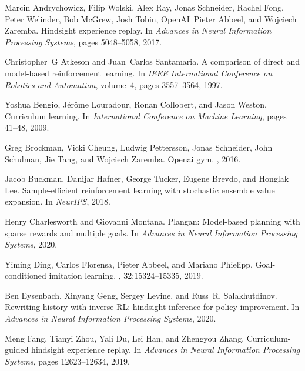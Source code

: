 \documentclass{article}
\begin{document}
\begin{thebibliography}{10}

Marcin Andrychowicz, Filip Wolski, Alex Ray, Jonas Schneider, Rachel Fong,
  Peter Welinder, Bob McGrew, Josh Tobin, OpenAI~Pieter Abbeel, and Wojciech
  Zaremba.
\newblock Hindsight experience replay.
\newblock In {\em Advances in Neural Information Processing Systems}, pages
  5048--5058, 2017.

Christopher~G Atkeson and Juan~Carlos Santamaria.
\newblock A comparison of direct and model-based reinforcement learning.
\newblock In {\em IEEE International Conference on Robotics and Automation},
  volume~4, pages 3557--3564, 1997.

Yoshua Bengio, J{\'e}r{\^o}me Louradour, Ronan Collobert, and Jason Weston.
\newblock Curriculum learning.
\newblock In {\em International Conference on Machine Learning}, pages 41--48,
  2009.

Greg Brockman, Vicki Cheung, Ludwig Pettersson, Jonas Schneider, John Schulman,
  Jie Tang, and Wojciech Zaremba.
\newblock Openai gym.
, 2016.

Jacob Buckman, Danijar Hafner, George Tucker, Eugene Brevdo, and Honglak Lee.
\newblock Sample-efficient reinforcement learning with stochastic ensemble
  value expansion.
\newblock In {\em NeurIPS}, 2018.

Henry Charlesworth and Giovanni Montana.
\newblock Plangan: Model-based planning with sparse rewards and multiple goals.
\newblock In {\em Advances in Neural Information Processing Systems}, 2020.

Yiming Ding, Carlos Florensa, Pieter Abbeel, and Mariano Phielipp.
\newblock Goal-conditioned imitation learning.
,
  32:15324--15335, 2019.

Ben Eysenbach, Xinyang Geng, Sergey Levine, and Russ~R. Salakhutdinov.
\newblock Rewriting history with inverse {RL:} hindsight inference for policy
  improvement.
\newblock In {\em Advances in Neural Information Processing Systems}, 2020.

Meng Fang, Tianyi Zhou, Yali Du, Lei Han, and Zhengyou Zhang.
\newblock Curriculum-guided hindsight experience replay.
\newblock In {\em Advances in Neural Information Processing Systems}, pages
  12623--12634, 2019.


\end{thebibliography}
\end{document}
